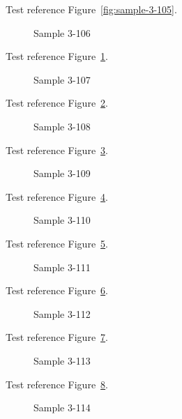 Test reference Figure~\ref{fig:sample-3-105}.

\begin{figure}[tbhp]
\caption{Sample 3-106}
\label{fig:sample-3-106}
\end{figure}

Test reference Figure~\ref{fig:sample-3-106}.

\begin{figure}[tbhp]
\caption{Sample 3-107}
\label{fig:sample-3-107}
\end{figure}

Test reference Figure~\ref{fig:sample-3-107}.

\begin{figure}[tbhp]
\caption{Sample 3-108}
\label{fig:sample-3-108}
\end{figure}

Test reference Figure~\ref{fig:sample-3-108}.

\begin{figure}[tbhp]
\caption{Sample 3-109}
\label{fig:sample-3-109}
\end{figure}

Test reference Figure~\ref{fig:sample-3-109}.

\begin{figure}[tbhp]
\caption{Sample 3-110}
\label{fig:sample-3-110}
\end{figure}

Test reference Figure~\ref{fig:sample-3-110}.

\begin{figure}[tbhp]
\caption{Sample 3-111}
\label{fig:sample-3-111}
\end{figure}

Test reference Figure~\ref{fig:sample-3-111}.

\begin{figure}[tbhp]
\caption{Sample 3-112}
\label{fig:sample-3-112}
\end{figure}

Test reference Figure~\ref{fig:sample-3-112}.

\begin{figure}[tbhp]
\caption{Sample 3-113}
\label{fig:sample-3-113}
\end{figure}

Test reference Figure~\ref{fig:sample-3-113}.

\begin{figure}[tbhp]
\caption{Sample 3-114}
\label{fig:sample-3-114}
\end{figure}

